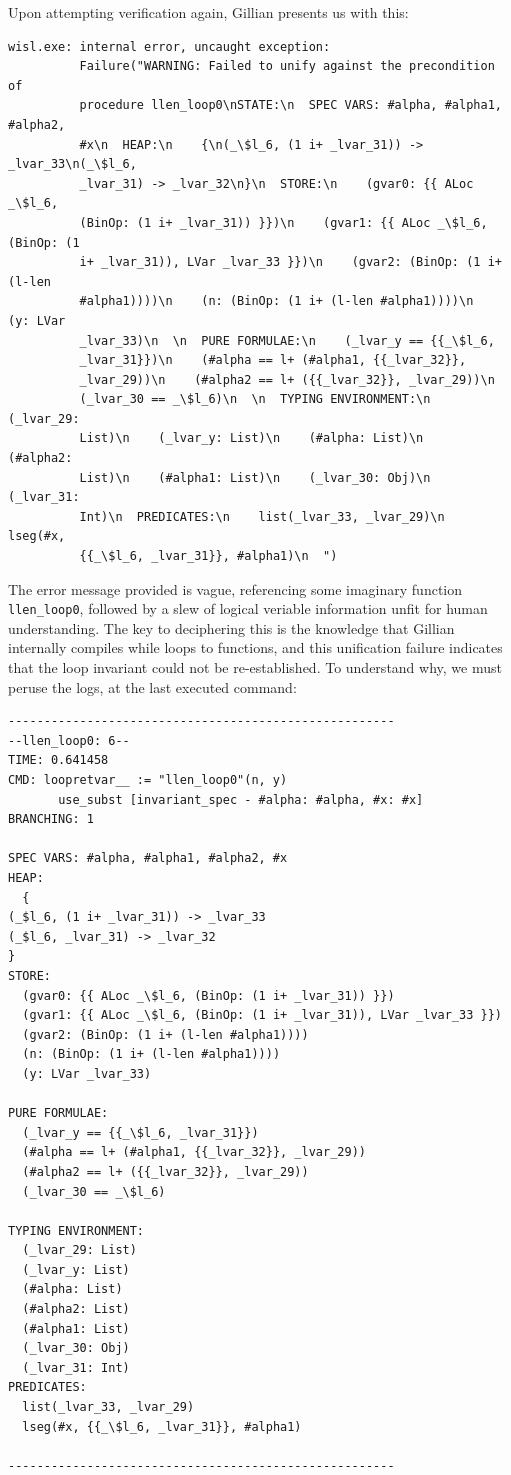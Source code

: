 Upon attempting verification again, Gillian presents us with this:
\begin{lstlisting}[style=code, numbers=none, caption={Verification: WISL list length error - precondition not met}]
wisl.exe: internal error, uncaught exception:
          Failure("WARNING: Failed to unify against the precondition of
          procedure llen_loop0\nSTATE:\n  SPEC VARS: #alpha, #alpha1, #alpha2,
          #x\n  HEAP:\n    {\n(_\$l_6, (1 i+ _lvar_31)) -> _lvar_33\n(_\$l_6,
          _lvar_31) -> _lvar_32\n}\n  STORE:\n    (gvar0: {{ ALoc _\$l_6,
          (BinOp: (1 i+ _lvar_31)) }})\n    (gvar1: {{ ALoc _\$l_6, (BinOp: (1
          i+ _lvar_31)), LVar _lvar_33 }})\n    (gvar2: (BinOp: (1 i+ (l-len
          #alpha1))))\n    (n: (BinOp: (1 i+ (l-len #alpha1))))\n    (y: LVar
          _lvar_33)\n  \n  PURE FORMULAE:\n    (_lvar_y == {{_\$l_6,
          _lvar_31}})\n    (#alpha == l+ (#alpha1, {{_lvar_32}},
          _lvar_29))\n    (#alpha2 == l+ ({{_lvar_32}}, _lvar_29))\n
          (_lvar_30 == _\$l_6)\n  \n  TYPING ENVIRONMENT:\n    (_lvar_29:
          List)\n    (_lvar_y: List)\n    (#alpha: List)\n    (#alpha2:
          List)\n    (#alpha1: List)\n    (_lvar_30: Obj)\n    (_lvar_31:
          Int)\n  PREDICATES:\n    list(_lvar_33, _lvar_29)\n    lseg(#x,
          {{_\$l_6, _lvar_31}}, #alpha1)\n  ")
\end{lstlisting}

The error message provided is vague, referencing some imaginary function
\texttt{llen\_loop0}, followed by a slew of logical veriable information unfit
for human understanding. The key to deciphering this is the knowledge that
Gillian internally compiles while loops to functions, and this unification
failure indicates that the loop invariant could not be re-established. To
understand why, we must peruse the logs, at the last executed command:
\begin{lstlisting}[style=code, numbers=none, caption={Loop invariant failure - Gillian log file}]
------------------------------------------------------
--llen_loop0: 6--
TIME: 0.641458
CMD: loopretvar__ := "llen_loop0"(n, y) 
       use_subst [invariant_spec - #alpha: #alpha, #x: #x]
BRANCHING: 1

SPEC VARS: #alpha, #alpha1, #alpha2, #x
HEAP:
  {
(_$l_6, (1 i+ _lvar_31)) -> _lvar_33
(_$l_6, _lvar_31) -> _lvar_32
}
STORE:
  (gvar0: {{ ALoc _\$l_6, (BinOp: (1 i+ _lvar_31)) }})
  (gvar1: {{ ALoc _\$l_6, (BinOp: (1 i+ _lvar_31)), LVar _lvar_33 }})
  (gvar2: (BinOp: (1 i+ (l-len #alpha1))))
  (n: (BinOp: (1 i+ (l-len #alpha1))))
  (y: LVar _lvar_33)

PURE FORMULAE:
  (_lvar_y == {{_\$l_6, _lvar_31}})
  (#alpha == l+ (#alpha1, {{_lvar_32}}, _lvar_29))
  (#alpha2 == l+ ({{_lvar_32}}, _lvar_29))
  (_lvar_30 == _\$l_6)

TYPING ENVIRONMENT:
  (_lvar_29: List)
  (_lvar_y: List)
  (#alpha: List)
  (#alpha2: List)
  (#alpha1: List)
  (_lvar_30: Obj)
  (_lvar_31: Int)
PREDICATES:
  list(_lvar_33, _lvar_29)
  lseg(#x, {{_\$l_6, _lvar_31}}, #alpha1)

------------------------------------------------------
\end{lstlisting}


